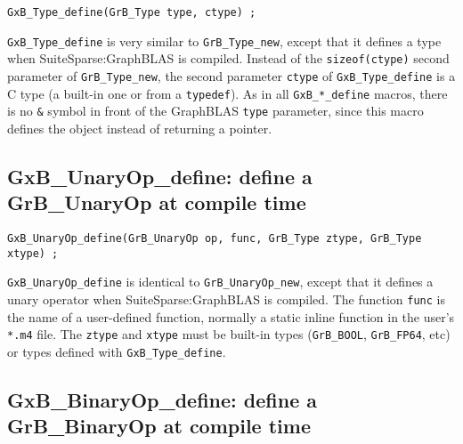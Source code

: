 \documentclass[12pt]{article}
\begin{document}
\begin{mdframed}[userdefinedwidth=6in]
{\footnotesize
\begin{verbatim}
GxB_Type_define(GrB_Type type, ctype) ;
\end{verbatim} } \end{mdframed}

    \verb'GxB_Type_define' is very similar to \verb'GrB_Type_new', except that
    it defines a type when SuiteSparse:GraphBLAS is compiled.  Instead of the
    \verb'sizeof(ctype)' second parameter of \verb'GrB_Type_new', the second
    parameter \verb'ctype' of \verb'GxB_Type_define' is a C type (a built-in
    one or from a \verb'typedef').  As in all \verb'GxB_*_define' macros, there
    is no \verb'&' symbol in front of the GraphBLAS \verb'type' parameter,
    since this macro defines the object instead of returning a pointer.

\subsection{{\sf GxB\_UnaryOp\_define:}
define a {\sf GrB\_UnaryOp} at compile time}
\label{unaryop_define}

\begin{mdframed}[userdefinedwidth=6in]
{\footnotesize
\begin{verbatim}
GxB_UnaryOp_define(GrB_UnaryOp op, func, GrB_Type ztype, GrB_Type xtype) ;
\end{verbatim} } \end{mdframed}

    \verb'GxB_UnaryOp_define' is identical to \verb'GrB_UnaryOp_new', except
    that it defines a unary operator when SuiteSparse:GraphBLAS is compiled.
    The function \verb'func' is the name of a user-defined function, normally a
    static inline function in the user's \verb'*.m4' file.  The \verb'ztype'
    and \verb'xtype' must be built-in types (\verb'GrB_BOOL', \verb'GrB_FP64',
    etc) or types defined with \verb'GxB_Type_define'.

\subsection{{\sf GxB\_BinaryOp\_define:}
define a {\sf GrB\_BinaryOp} at compile time}
\label{binaryop_define}
\end{document}
